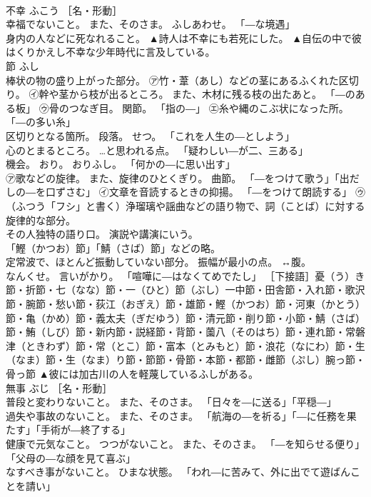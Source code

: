 \documentclass[8pt]{extreport}
\begin{document}
\begin{CJK}{UTF8}{min}
\\	不幸	ふこう	［名・形動］ 
\\	幸福でないこと。 また、そのさま。 ふしあわせ。 「―な境遇」 
\\	身内の人などに死なれること。	▲詩人は不幸にも若死にした。 ▲自伝の中で彼はくりかえし不幸な少年時代に言及している。
\\	節	ふし	
\\	棒状の物の盛り上がった部分。 ㋐竹・葦（あし）などの茎にあるふくれた区切り。 ㋑幹や茎から枝が出るところ。 また、木材に残る枝の出たあと。 「―のある板」 ㋒骨のつなぎ目。 関節。 「指の―」 ㋓糸や縄のこぶ状になった所。 「―の多い糸」 
\\	区切りとなる箇所。 段落。 せつ。 「これを人生の―としよう」 
\\	心のとまるところ。 …と思われる点。 「疑わしい―が二、三ある」 
\\	機会。 おり。 おりふし。 「何かの―に思い出す」 
\\	㋐歌などの旋律。 また、旋律のひとくぎり。 曲節。 「―をつけて歌う」「出だしの―を口ずさむ」 ㋑文章を音読するときの抑揚。 「―をつけて朗読する」 ㋒（ふつう「フシ」と書く）浄瑠璃や謡曲などの語り物で、詞（ことば）に対する旋律的な部分。 
\\	その人独特の語り口。 演説や講演にいう。 
\\	「鰹（かつお）節」「鯖（さば）節」などの略。 
\\	定常波で、ほとんど振動していない部分。 振幅が最小の点。 ↔腹。 
\\	なんくせ。 言いがかり。 「喧嘩に―はなくてめでたし」 ［下接語］憂（う）き節・折節・七（なな）節・一（ひと）節（ぶし）一中節・田舎節・入れ節・歌沢節・腕節・愁い節・荻江（おぎえ）節・雄節・鰹（かつお）節・河東（かとう）節・亀（かめ）節・義太夫（ぎだゆう）節・清元節・削り節・小節・鯖（さば）節・鮪（しび）節・新内節・説経節・背節・薗八（そのはち）節・連れ節・常磐津（ときわず）節・常（とこ）節・富本（とみもと）節・浪花（なにわ）節・生（なま）節・生（なま）り節・節節・骨節・本節・都節・雌節（ぷし）腕っ節・骨っ節	▲彼には加古川の人を軽蔑しているふしがある。
\\	無事	ぶじ	［名・形動］ 
\\	普段と変わりないこと。 また、そのさま。 「日々を―に送る」「平穏―」 
\\	過失や事故のないこと。 また、そのさま。 「航海の―を祈る」「―に任務を果たす」「手術が―終了する」 
\\	健康で元気なこと。 つつがないこと。 また、そのさま。 「―を知らせる便り」「父母の―な顔を見て喜ぶ」 
\\	なすべき事がないこと。 ひまな状態。 「われ―に苦みて、外に出でて遊ばんことを請い」 

\end{CJK}
\end{document}
